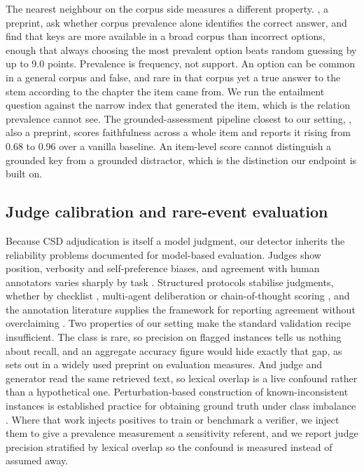 \documentclass[11pt]{article}
\begin{document}
The nearest neighbour on the corpus side measures a different property. \citet{zotos2026corpus}, a preprint, ask whether corpus prevalence alone identifies the correct answer, and find that keys are more available in a broad corpus than incorrect options, enough that always choosing the most prevalent option beats random guessing by up to 9.0 points. Prevalence is frequency, not support. An option can be common in a general corpus and false, and rare in that corpus yet a true answer to the stem according to the chapter the item came from. We run the entailment question against the narrow index that generated the item, which is the relation prevalence cannot see. The grounded-assessment pipeline closest to our setting, \citet{faria2026teachmate}, also a preprint, scores faithfulness across a whole item and reports it rising from 0.68 to 0.96 over a vanilla baseline. An item-level score cannot distinguish a grounded key from a grounded distractor, which is the distinction our endpoint is built on.

\subsection{Judge calibration and rare-event evaluation}

Because CSD adjudication is itself a model judgment, our detector inherits the reliability problems documented for model-based evaluation. Judges show position, verbosity and self-preference biases, and agreement with human annotators varies sharply by task \citep{li2024llmsasjudges,thakur2024judging,huang2025empirical,raina2024llmasajudge}. Structured protocols stabilise judgments, whether by checklist \citep{lee2025checkeval}, multi-agent deliberation \citep{chan2023chateval} or chain-of-thought scoring \citep{liu2023geval}, and the annotation literature supplies the framework for reporting agreement without overclaiming \citep{braylan2022measuring,richie2022interannotator}. Two properties of our setting make the standard validation recipe insufficient. The class is rare, so precision on flagged instances tells us nothing about recall, and an aggregate accuracy figure would hide exactly that gap, as \citet{powers2020evaluation} sets out in a widely used preprint on evaluation measures. And judge and generator read the same retrieved text, so lexical overlap is a live confound rather than a hypothetical one. Perturbation-based construction of known-inconsistent instances is established practice for obtaining ground truth under class imbalance \citep{utama2022falsesum,zhang2024enhancing}. Where that work injects positives to train or benchmark a verifier, we inject them to give a prevalence measurement a sensitivity referent, and we report judge precision stratified by lexical overlap so the confound is measured instead of assumed away.
\end{document}
